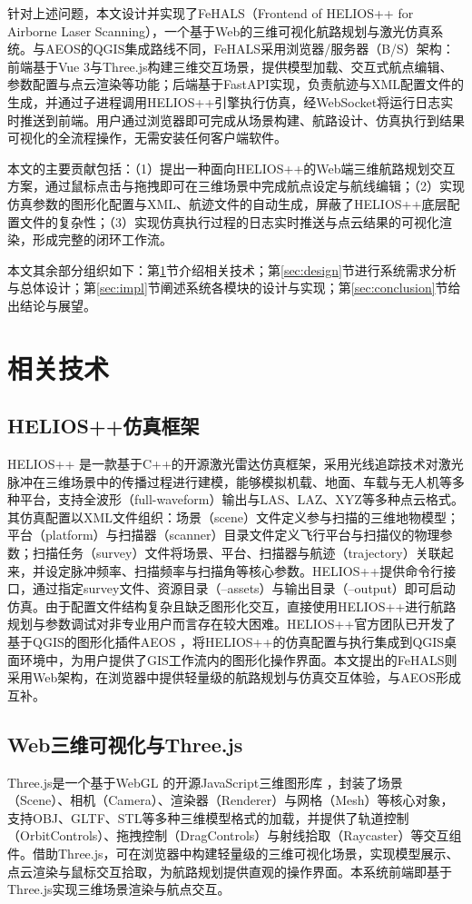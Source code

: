 \documentclass[a4paper,fleqn]{cas-sc}
\begin{document}
针对上述问题，本文设计并实现了FeHALS（Frontend of HELIOS++ for Airborne Laser Scanning），一个基于Web的三维可视化航路规划与激光仿真系统。与AEOS的QGIS集成路线不同，FeHALS采用浏览器/服务器（B/S）架构：前端基于Vue 3与Three.js构建三维交互场景，提供模型加载、交互式航点编辑、参数配置与点云渲染等功能；后端基于FastAPI实现，负责航迹与XML配置文件的生成，并通过子进程调用HELIOS++引擎执行仿真，经WebSocket将运行日志实时推送到前端。用户通过浏览器即可完成从场景构建、航路设计、仿真执行到结果可视化的全流程操作，无需安装任何客户端软件。

本文的主要贡献包括：（1）提出一种面向HELIOS++的Web端三维航路规划交互方案，通过鼠标点击与拖拽即可在三维场景中完成航点设定与航线编辑；（2）实现仿真参数的图形化配置与XML、航迹文件的自动生成，屏蔽了HELIOS++底层配置文件的复杂性；（3）实现仿真执行过程的日志实时推送与点云结果的可视化渲染，形成完整的闭环工作流。

本文其余部分组织如下：第\ref{sec:tech}节介绍相关技术；第\ref{sec:design}节进行系统需求分析与总体设计；第\ref{sec:impl}节阐述系统各模块的设计与实现；第\ref{sec:conclusion}节给出结论与展望。

\section{相关技术}\label{sec:tech}
\subsection{HELIOS++仿真框架}
HELIOS++ \citep{heliosPlusPlus}是一款基于C++的开源激光雷达仿真框架，采用光线追踪技术对激光脉冲在三维场景中的传播过程进行建模，能够模拟机载、地面、车载与无人机等多种平台，支持全波形（full-waveform）输出与LAS、LAZ、XYZ等多种点云格式。其仿真配置以XML文件组织：场景（scene）文件定义参与扫描的三维地物模型；平台（platform）与扫描器（scanner）目录文件定义飞行平台与扫描仪的物理参数；扫描任务（survey）文件将场景、平台、扫描器与航迹（trajectory）关联起来，并设定脉冲频率、扫描频率与扫描角等核心参数。HELIOS++提供命令行接口，通过指定survey文件、资源目录（--assets）与输出目录（--output）即可启动仿真。由于配置文件结构复杂且缺乏图形化交互，直接使用HELIOS++进行航路规划与参数调试对非专业用户而言存在较大困难。HELIOS++官方团队已开发了基于QGIS的图形化插件AEOS \citep{aeos}，将HELIOS++的仿真配置与执行集成到QGIS桌面环境中，为用户提供了GIS工作流内的图形化操作界面。本文提出的FeHALS则采用Web架构，在浏览器中提供轻量级的航路规划与仿真交互体验，与AEOS形成互补。

\subsection{Web三维可视化与Three.js}
Three.js是一个基于WebGL \citep{webgl} 的开源JavaScript三维图形库 \citep{threejs}，封装了场景（Scene）、相机（Camera）、渲染器（Renderer）与网格（Mesh）等核心对象，支持OBJ、GLTF、STL等多种三维模型格式的加载，并提供了轨道控制（OrbitControls）、拖拽控制（DragControls）与射线拾取（Raycaster）等交互组件。借助Three.js，可在浏览器中构建轻量级的三维可视化场景，实现模型展示、点云渲染与鼠标交互拾取，为航路规划提供直观的操作界面。本系统前端即基于Three.js实现三维场景渲染与航点交互。
\end{document}
